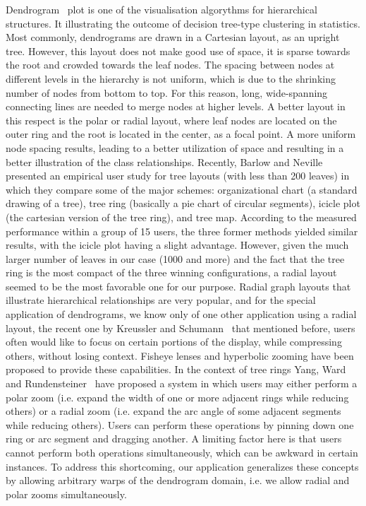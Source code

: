 Dendrogram~\cite{Dendrogram} plot is one of the visualisation algorythms for hierarchical structures. It illustrating the outcome of decision tree-type clustering in statistics. Most commonly, dendrograms are drawn in a Cartesian layout, as an upright tree. However, this layout does not make good use of space, it is sparse towards the root and crowded towards the leaf nodes. The spacing between nodes at different levels in the hierarchy is not uniform, which is due to the shrinking number of nodes from bottom to top. For this reason, long, wide-spanning connecting lines are needed to merge nodes at higher levels. A better layout in this respect is the polar or radial layout, where leaf nodes are located on the outer ring and the root is located in the center, as a focal point. A more uniform node spacing results, leading to a better utilization of space and resulting in a better illustration of the class relationships. Recently, Barlow and Neville~\cite{Barlow_Neville} presented an empirical user study for tree layouts (with less than 200 leaves) in which they compare some of the major schemes: organizational chart (a standard drawing of a tree), tree ring (basically a pie chart of circular segments), icicle plot (the cartesian version of the tree ring), and tree map. According to the measured performance within a group of 15 users, the three former methods yielded similar results, with the icicle plot having a slight advantage. However, given the much larger number of leaves in our case (1000 and more) and the fact that the tree ring is the most compact of the three winning configurations, a radial layout seemed to be the most favorable one for our purpose. Radial graph layouts that illustrate hierarchical relationships are very popular, and for the special application of dendrograms, we know only of one other application using a radial layout, the recent one by Kreussler and Schumann~\cite{Kreussler_Schumann} that mentioned before, users often would like to focus on certain portions of the display, while compressing others, without losing context. Fisheye lenses and hyperbolic zooming have been proposed to provide these capabilities. In the context of tree rings Yang, Ward and Rundensteiner~\cite{Yang_Ward} have proposed a system in which users may either perform a polar zoom (i.e. expand the width of one or more adjacent rings while reducing others) or a radial zoom (i.e. expand the arc angle of some adjacent segments while reducing others). Users can perform these operations by pinning down one ring or arc segment and dragging another. A limiting factor here is that users cannot perform both operations simultaneously, which can be awkward in certain instances. To address this shortcoming, our application generalizes these concepts by allowing arbitrary warps of the dendrogram domain, i.e. we allow radial and polar zooms simultaneously.


